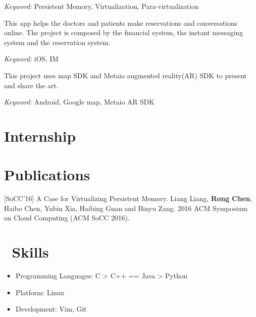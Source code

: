 \documentclass{resume}
\begin{document}
\textit{Keyword: } Persistent Memory, Virtualization, Para-virtualization



This app helps the doctors and patients make reservations and conversations online. 
The project is composed by the financial system, the instant messaging system and the reservation system.

\textit{Keyword: } iOS, IM

This project uses map SDK and Metaio augmented reality(AR) SDK to present and share the art. 

\textit{Keyword: } Android, Google map, Metaio AR SDK


\section{Internship}

\section{Publications}
[SoCC'16] A Case for Virtualizing Persistent Memory. Liang Liang, \textbf{Rong Chen}, Haibo Chen, Yubin Xia, Haibing Guan and Binyu Zang. 2016 ACM Symposium on Cloud Computing (ACM SoCC 2016).


\section{\faCogs\ Skills}
\begin{itemize}[parsep=0.5ex]
  \item Programming Languages: C > C++ == Java > Python
  \item Platform: Linux
  \item Development: Vim, Git
\end{itemize}

\end{document}
